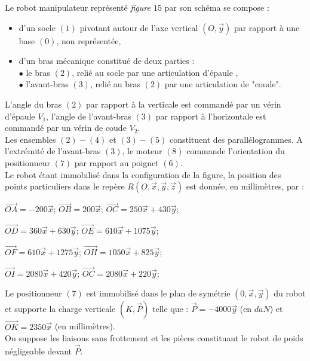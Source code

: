 Le robot manipulateur représenté \textit{figure $15$} par son schéma se compose :
\begin{itemize}
\item d'un socle $(1)$ pivotant autour de l'axe vertical $(O,\overrightarrow{y})$ par rapport à une base $(0)$, non représentée,
\item d'un bras mécanique constitué de deux parties :\\
$\bullet$ le \og bras \fg{} $(2)$, relié au socle par une articulation \og d'épaule \fg{},\\
$\bullet$ \og l'avant-bras \fg{} $(3)$, relié au bras $(2)$ par une articulation de "coude".
\end{itemize}
L'angle du bras $(2)$ par rapport à la verticale est commandé par un \og vérin d'épaule \fg{} $V_1$, l'angle de l'avant-bras $(3)$ par rapport à l'horizontale est commandé par un \og vérin de coude \fg{} $V_2$.\\
Les ensembles $(2)-(4)$ et $(3)-(5)$ constituent des parallélogrammes. A l'extrémité de l'avant-bras $(3)$, le moteur $(8)$ commande l'orientation du positionneur $(7)$ par rapport au poignet $(6)$.\\
Le robot étant immobilisé dans la configuration de la figure, la position des points particuliers dans le repère $R(O,\overrightarrow{x},\overrightarrow{y},\overrightarrow{z})$ est donnée, en millimètres, par :

\begin{description}
\item $\overrightarrow{OA}=-200\overrightarrow{x}$; $\overrightarrow{OB}=200\overrightarrow{x}$; $\overrightarrow{OC}=250\overrightarrow{x}+430\overrightarrow{y}$;
\item $\overrightarrow{OD}=360\overrightarrow{x}+630\overrightarrow{y}$; $\overrightarrow{OE}=610\overrightarrow{x}+1075\overrightarrow{y}$;
\item $\overrightarrow{OF}=610\overrightarrow{x}+1275\overrightarrow{y}$; $\overrightarrow{OH}=1050\overrightarrow{x}+825\overrightarrow{y}$;
\item $\overrightarrow{OI}=2080\overrightarrow{x}+420\overrightarrow{y}$; $\overrightarrow{OC}=2080\overrightarrow{x}+220\overrightarrow{y}$;
\end{description}

Le positionneur $(7)$ est immobilisé dans le plan de symétrie $(0,\overrightarrow{x},\overrightarrow{y})$ du robot et supporte la charge verticale $(K,\overrightarrow{P})$ telle que : $\overrightarrow{P}=-4000\overrightarrow{y}$ (en $daN$) et $\overrightarrow{OK}=2350\overrightarrow{x}$ (en millimètres).\\
On suppose les liaisons sans frottement et les pièces constituant le robot de poids négligeable devant $\overrightarrow{P}$.

